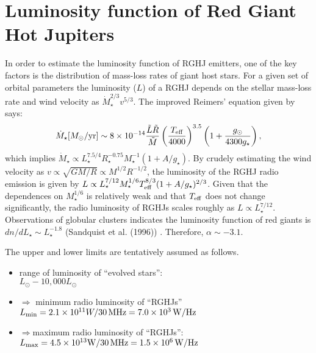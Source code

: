 \documentclass[iop,numberedappendix,apj,twocolappendix,]{emulateapj}
\begin{document}
\newpage


\appendix

\section{Luminosity function of Red Giant Hot Jupiters}

In order to estimate the luminosity function of RGHJ emitters, one of the key factors is the distribution of mass-loss rates of giant host stars. 
For a given set of orbital parameters the luminosity ($L$) of a RGHJ depends on the stellar mass-loss rate and wind velocity as $\dot{M}_\star^{2/3} v^{5/3}$. 
The improved Reimers' equation \citep{reimers1975} given by \citet{schroder2005,schroder2007} says:
\begin{equation}
\dot M_\star [M_\odot{\rm /yr}] \sim 8 \times 10^{-14} \frac{\tilde L \tilde R}{\tilde M} \left( \frac{T_{\rm eff}}{4000} \right)^{3.5} \left( 1 + \frac{g_{\odot }}{4300 g_{\star}} \right), \label{eq:mass-loss}
\end{equation}
which implies $\dot{M}_\star \propto L_\star^{7.5/4} R_\star^{-0.75} M_\star^{-1} (1+A/g_\star)$. 
By crudely estimating the wind velocity as $v \propto \sqrt{GM/R} \propto M^{1/2} R^{-1/2}$, the luminosity of the RGHJ radio emission is given by $L \propto L_\star^{7/12} M_\star^{1/6} T_{\rm eff}^{8/3} (1+A/g_\star)^{2/3}$. 
Given that the dependences on $M_\star^{1/6}$ is relatively weak and that $T_{\rm eff}$ does not change significantly, the radio luminosity of RGHJs scales roughly as $L \propto L_{\star }^{7/12}$. 
Observations of globular clusters indicates the luminosity function of red giants is $dn/dL_{\star } \sim L_{\star }^{-1.8}$ (Sandquist et al. (1996)) %
. Therefore, $\alpha \sim -3.1$. 

The upper and lower limits are tentatively assumed as follows. 
\begin{itemize}
\item range of luminosity of ``evolved stars'':\\$L_{\odot }-10,000 L_{\odot }$
\item $\Rightarrow$ minimum radio luminosity of ``RGHJs''\\%
$L_{\rm min} = 2.1\times 10^{11} W/30\,{\rm MHz} = 7.0 \times 10^3\,{\rm W/Hz}$
\item $\Rightarrow $maximum radio luminosity of ``RGHJs'':\\$L_{\rm max} = 4.5\times 10^{13}{\rm W}/30\,{\rm MHz} = 1.5 \times 10^{6}\,{\rm W/Hz}$
\end{itemize}


\end{document}
